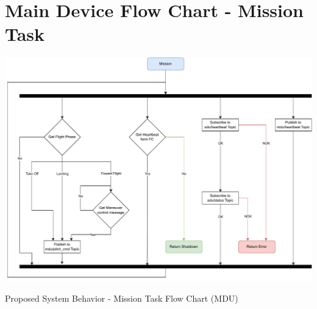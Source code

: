 
\chapter{Main Device Flow Chart - Mission Task} %

\label{AppendixB}

\begin{algorithm}[H]
    \centering
    \includegraphics[scale=0.6,angle=270,origin=c]{appendices/assets/MDU_MISSION.pdf}
    \caption{Proposed System Behavior - Mission Task Flow Chart (MDU)}
    \label{alg:MDU_MISSION}
\end{algorithm}

